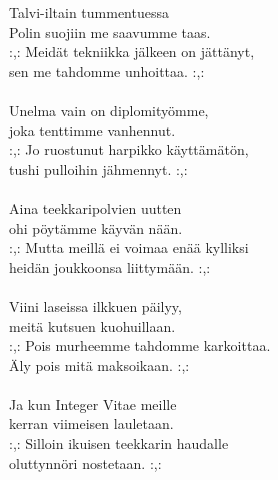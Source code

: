 
            Talvi-iltain tummentuessa \\
            Polin suojiin me saavumme taas. \\
            :,: Meidät tekniikka jälkeen on jättänyt, \\
            sen me tahdomme unhoittaa. :,: \\
\hspace{10mm} \\
            Unelma vain on diplomityömme, \\
            joka tenttimme vanhennut. \\
            :,: Jo ruostunut harpikko käyttämätön, \\
            tushi pulloihin jähmennyt. :,: \\
\hspace{10mm} \\
            Aina teekkaripolvien uutten \\
            ohi pöytämme käyvän nään. \\
            :,: Mutta meillä ei voimaa enää kylliksi \\
            heidän joukkoonsa liittymään. :,: \\
\hspace{10mm} \\
            Viini laseissa ilkkuen päilyy, \\
            meitä kutsuen kuohuillaan. \\
            :,: Pois murheemme tahdomme karkoittaa. \\
            Äly pois mitä maksoikaan. :,: \\
\hspace{10mm} \\
            Ja kun Integer Vitae meille \\
            kerran viimeisen lauletaan. \\
            :,: Silloin ikuisen teekkarin haudalle \\
            oluttynnöri nostetaan. :,: \\
